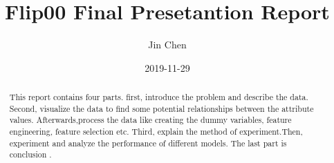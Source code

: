 \documentclass{amsart}
\begin{document}
%
%
\title[Chen Jin's Flip00 ]{Flip00 Final Presetantion Report}%

\author{Jin Chen}
\address[A.~1]{,\\ Business school of HuNan University, Changsha , China}%





%
\date{ 2019-11-29}%

\begin{abstract}
This report contains four parts. 
first, 
introduce the problem and describe the data. 
Second, 
visualize the data to find some potential relationships 
between the attribute values.
Afterwards,process the data 
like creating the dummy variables, feature engineering, feature selection etc. 
Third, 
explain the method of experiment.Then, experiment and 
analyze the performance of different models.
The last part is conclusion . 
\end{abstract}

\maketitle
\tableofcontents

\newpage






\newpage


\end{document}
